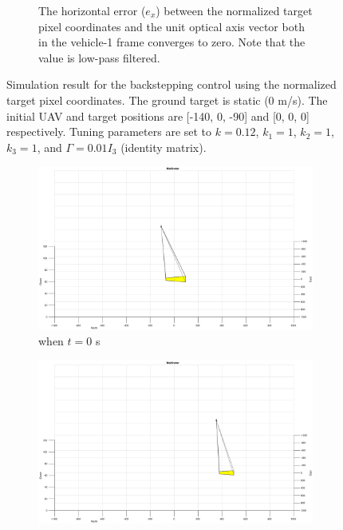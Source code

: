 \begin{figure}[htbp]
\begin{subfigure}[t]{0.8\linewidth}
		\caption{The horizontal error ($e_x$) between the normalized target pixel coordinates and the unit optical axis vector both in the vehicle-1 frame converges to zero. Note that the value is low-pass filtered.}
	\end{subfigure}	
	\caption[Simulation result for the backstepping control using the normalized target pixel coordinates.]{Simulation result for the backstepping control using the normalized target pixel coordinates. The ground target is static (0 m/s). The initial UAV and target positions are [-140, 0, -90] and [0, 0, 0] respectively. Tuning parameters are set to $k=0.12$, $k_1=1$, $k_2=1$, $k_3=1$, and $\Gamma=0.01I_3$ (identity matrix).}
	\label{image_0mps}
\end{figure}

\begin{figure}[htbp]
	\centering
	\begin{subfigure}[t]{0.32\linewidth}
		\includegraphics[width=\textwidth]{images/chapter4/image_UAV_5mps}
		\caption{when $t=0$ s}
	\end{subfigure}
	\begin{subfigure}[t]{0.32\linewidth}
		\includegraphics[width=\textwidth]{images/chapter4/image_UAV_5mps_90s}

\end{subfigure}
\end{figure}
